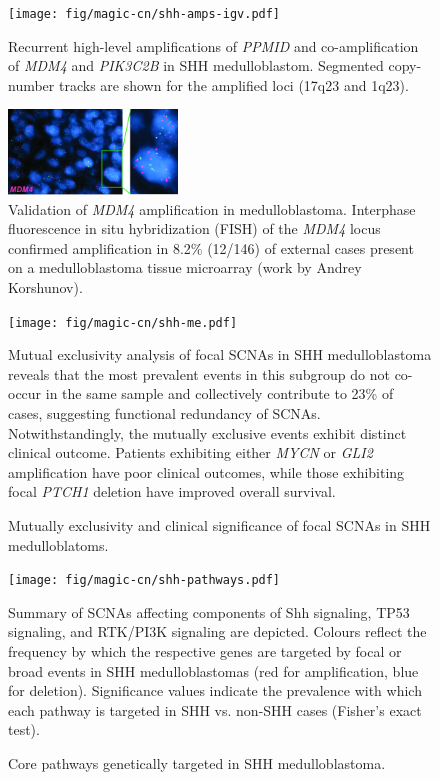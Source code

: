 \documentclass[11pt,letterpaper]{article}
\theoremstyle{definition}
\begin{document}
\begin{figure}
	\centering
	\texttt{[image: fig/magic-cn/shh-amps-igv.pdf]}
	\caption{Recurrent high-level amplifications of \emph{PPMID} and co-amplification of \emph{MDM4} and \emph{PIK3C2B} in SHH medulloblastom.
	Segmented copy-number tracks are shown for the amplified loci (17q23 and 1q23).}
	\label{fig:shh-amps-igv}
\end{figure}

\begin{figure}
	\centering
	\includegraphics[width=0.4\textwidth]{fig/magic-cn/mdm4-fish.jpg}
	\caption{Validation of \emph{MDM4} amplification in medulloblastoma.
	Interphase fluorescence in situ hybridization (FISH) of the \emph{MDM4} locus confirmed amplification in 8.2\% (12/146) of external cases present on a medulloblastoma tissue microarray (work by Andrey Korshunov).}
	\label{fig:mdm4-fish}
\end{figure}

\clearpage

\begin{figure}[h]
	\begin{center}
		\texttt{[image: fig/magic-cn/shh-me.pdf]}
	\end{center}
	\caption{Mutually exclusivity and clinical significance of focal SCNAs in SHH medulloblatoms.}
	Mutual exclusivity analysis of focal SCNAs in SHH medulloblastoma reveals that the most prevalent events in this subgroup do not co-occur in the same sample and collectively contribute to 23\% of cases, suggesting functional redundancy of SCNAs. Notwithstandingly, the mutually exclusive events exhibit distinct clinical outcome. Patients exhibiting either \emph{MYCN} or \emph{GLI2} amplification have poor clinical outcomes, while those exhibiting focal \emph{PTCH1} deletion have improved overall survival.
	\label{fig:shh-me}
\end{figure}

\begin{figure}[h]
	\begin{center}
		\texttt{[image: fig/magic-cn/shh-pathways.pdf]}
	\end{center}
	\caption{Core pathways genetically targeted in SHH medulloblastoma.}
	Summary of SCNAs affecting components of Shh signaling, TP53 signaling, and RTK/PI3K signaling are depicted. Colours reflect the frequency by which the respective genes are targeted by focal or broad events in SHH medulloblastomas (red for amplification, blue for deletion). Significance values indicate the prevalence with which each pathway is targeted in SHH vs. non-SHH cases (Fisher's exact test).
	\label{fig:shh-pathways}
\end{figure}
\end{document}
